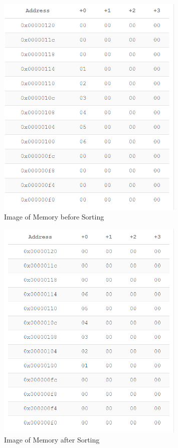 \documentclass{article}
\begin{document}
\begin{figure}[h]
    \centering
    \includegraphics[width=0.8\textwidth]{before.png}
    \caption{Image of Memory before Sorting}
    \label{fig:SelectionSort}
\end{figure}

\begin{figure}[h]
    \centering
    \includegraphics[width=0.8\textwidth]{after.png}
    \caption{Image of Memory after Sorting}
    \label{fig:SelectionSort2}
\end{figure}
\end{document}

